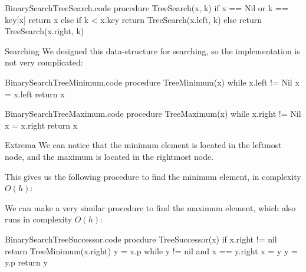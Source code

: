 \documentclass[a4paper]{article}
\begin{document}
\begin{filecontents*}[overwrite]{BinarySearchTreeSearch.code}
procedure TreeSearch(x, k)
    if x == Nil or k == key[x]
        return x
    else if k < x.key
        return TreeSearch(x.left, k)
    else
        return TreeSearch(x.right, k)
\end{filecontents*}

\begin{parag}{Searching}
    We designed this data-structure for searching, so the implementation is not very complicated:
    
\end{parag}


\begin{filecontents*}[overwrite]{BinarySearchTreeMinimum.code}
procedure TreeMinimum(x)
    while x.left != Nil
        x = x.left
    return x
\end{filecontents*}

\begin{filecontents*}[overwrite]{BinarySearchTreeMaximum.code}
procedure TreeMaximum(x)
    while x.right != Nil
        x = x.right
    return x
\end{filecontents*}

\begin{parag}{Extrema}
    We can notice that the minimum element is located in the leftmost node, and the maximum is located in the rightmost node.

    This gives us the following procedure to find the minimum element, in complexity $O\left(h\right)$: 
    
    We can make a very similar procedure to find the maximum element, which also runs in complexity $O\left(h\right)$: 
\end{parag}

\begin{filecontents*}[overwrite]{BinarySearchTreeSuccessor.code}
procdure TreeSuccessor(x)
    if x.right != nil
        return TreeMinimum(x.right)
    y = x.p
    while y != nil and x == y.right
        x = y
        y = y.p
    return y
\end{filecontents*}
\end{document}
